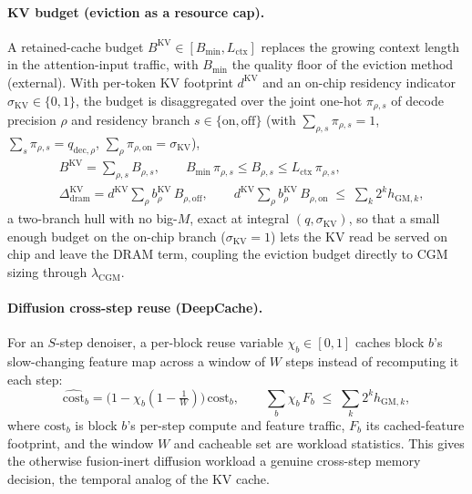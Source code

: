\paragraph{KV budget (eviction as a resource cap).}
A retained-cache budget $B^{\mathrm{KV}} \in [B_{\min},L_{\mathrm{ctx}}]$ replaces
the growing context length in the attention-input traffic, with $B_{\min}$ the
quality floor of the eviction method (external). With per-token KV footprint
$d^{\mathrm{KV}}$ and an on-chip residency indicator $\sigma_{\mathrm{KV}}\in
\{0,1\}$, the budget is disaggregated over the joint one-hot $\pi_{\rho,s}$ of
decode precision $\rho$ and residency branch $s\in\{\mathrm{on},\mathrm{off}\}$
(with $\sum_{\rho,s}\pi_{\rho,s}=1$, $\sum_s\pi_{\rho,s}=q_{\mathrm{dec},\rho}$,
$\sum_\rho\pi_{\rho,\mathrm{on}}=\sigma_{\mathrm{KV}}$),
\begin{equation}
\begin{aligned}
&B^{\mathrm{KV}}=\textstyle\sum_{\rho,s}B_{\rho,s},\qquad
B_{\min}\,\pi_{\rho,s}\le B_{\rho,s}\le L_{\mathrm{ctx}}\,\pi_{\rho,s},\\[2pt]
&\Delta^{\mathrm{KV}}_{\mathrm{dram}} =
   d^{\mathrm{KV}}\textstyle\sum_\rho b^{\mathrm{KV}}_\rho\, B_{\rho,\mathrm{off}},
\qquad
d^{\mathrm{KV}}\textstyle\sum_\rho b^{\mathrm{KV}}_\rho\, B_{\rho,\mathrm{on}}
   \;\le\; \textstyle\sum_k 2^k h_{\mathrm{GM},k},
\end{aligned}
\label{eq:v3_kvbudget}
\end{equation}
a two-branch hull with no big-$M$, exact at integral $(q,\sigma_{\mathrm{KV}})$,
so that a small enough budget on the on-chip branch ($\sigma_{\mathrm{KV}}=1$)
lets the KV read be served on chip and leave the DRAM term, coupling the
eviction budget directly to CGM sizing through $\lambda_{\mathrm{CGM}}$.

\paragraph{Diffusion cross-step reuse (DeepCache).}
For an $S$-step denoiser, a per-block reuse variable $\chi_b\in[0,1]$ caches block
$b$'s slow-changing feature map across a window of $W$ steps instead of
recomputing it each step:
\begin{equation}
\widehat{\mathrm{cost}}_b = \big(1 - \chi_b(1 - \tfrac1W)\big)\,\mathrm{cost}_b,
\qquad
\sum_b \chi_b\, F_b \;\le\; \textstyle\sum_k 2^k h_{\mathrm{GM},k},
\label{eq:v3_deepcache}
\end{equation}
where $\mathrm{cost}_b$ is block $b$'s per-step compute and feature traffic, $F_b$
its cached-feature footprint, and the window $W$ and cacheable set are workload
statistics. This gives the otherwise fusion-inert diffusion workload a genuine
cross-step memory decision, the temporal analog of the KV cache.

